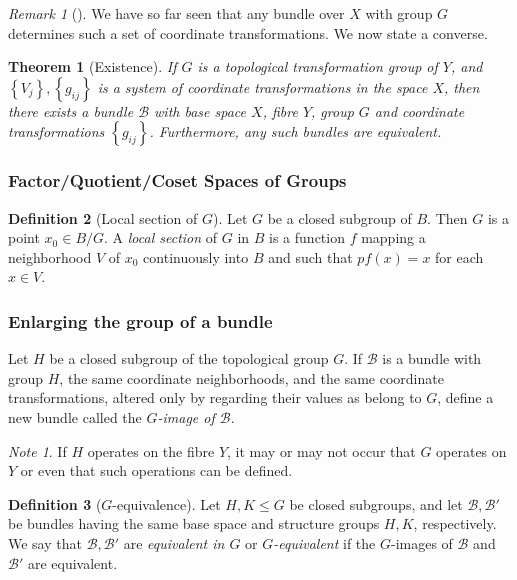 \documentclass[reqno]{amsart}
\newtheorem{theorem}{Theorem}[section]
\theoremstyle{definition}
\newtheorem{definition}[theorem]{Definition}
\theoremstyle{remark}
\newtheorem*{remark}{Remark}
\newtheorem*{note}{Note}
\begin{document}
\begin{remark}[]
    We have so far seen that any bundle over
    $X$ with group $G$ determines such a set of
    coordinate transformations. We now state a converse.
\end{remark}

\begin{theorem}[Existence]\label{Existence-theorem}
    If $G$ is a topological transformation group of
    $Y$, and $\left\{ V_j \right\} , 
    \left\{ g_{ij} \right\} $ is a system
    of coordinate transformations in the space
    $X$, then there exists a bundle $\mathcal{B}$ with
    base space $X$, fibre $Y$, group $G$ and
    coordinate transformations
    $\left\{ g_{ij} \right\} $. Furthermore,
    any such bundles are equivalent.
\end{theorem}

\subsubsection{Factor/Quotient/Coset Spaces of Groups}


\begin{definition}[Local section of $G$]
     Let $G$ be a closed subgroup of $B$. Then
     $G$ is a point
     $x_0 \in B / G$. A \textit{local section}
     of $G$ in $B$ is a function $f $ mapping a neighborhood
     $V$ of $x_0$ continuously into $B$ and such that
     $p f (x) = x$ for each $x \in V$.
\end{definition}



\subsubsection{Enlarging the group of a bundle}

Let $H$ be a closed subgroup of the
topological group $G$.
If $\mathcal{B}$ is a bundle with group $H$, the
same coordinate neighborhoods, and the same
coordinate transformations, altered
only by regarding their values as belong to $G$, define
a new bundle called the
\textit{$G$-image of $\mathcal{B}$}.\\
\begin{note}
    If $H$ operates on the fibre $Y$, it may or may not
    occur that $G$ operates on $Y$ or even 
    that such operations can be defined.
\end{note}

\begin{definition}[$G$-equivalence]
    Let $H,K \le G$ be closed subgroups, and let
    $\mathcal{B},\mathcal{B}'$ be bundles having the same
    base space and structure groups
    $H,K$, respectively. We say that
    $\mathcal{B},\mathcal{B}'$ are \textit{equivalent in
    $G$} or \textit{$G$-equivalent} if the
    $G$-images of $\mathcal{B}$ and
    $\mathcal{B}'$ are equivalent.
\end{definition}
\end{document}
